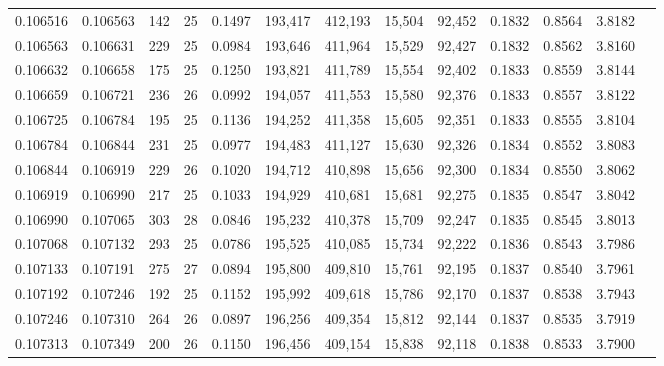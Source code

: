 \begin{tabular}{rrrrrrrrrrrrr}
0.106516 & 0.106563 & 142 &  25 &                                     0.1497 & 193,417 & 412,193 &  15,504 &  92,452 & 0.1832 & 0.8564 & 3.8182 \\
0.106563 & 0.106631 & 229 &  25 &                                     0.0984 & 193,646 & 411,964 &  15,529 &  92,427 & 0.1832 & 0.8562 & 3.8160 \\
0.106632 & 0.106658 & 175 &  25 &                                     0.1250 & 193,821 & 411,789 &  15,554 &  92,402 & 0.1833 & 0.8559 & 3.8144 \\
0.106659 & 0.106721 & 236 &  26 &                                     0.0992 & 194,057 & 411,553 &  15,580 &  92,376 & 0.1833 & 0.8557 & 3.8122 \\
0.106725 & 0.106784 & 195 &  25 &                                     0.1136 & 194,252 & 411,358 &  15,605 &  92,351 & 0.1833 & 0.8555 & 3.8104 \\
0.106784 & 0.106844 & 231 &  25 &                                     0.0977 & 194,483 & 411,127 &  15,630 &  92,326 & 0.1834 & 0.8552 & 3.8083 \\
0.106844 & 0.106919 & 229 &  26 &                                     0.1020 & 194,712 & 410,898 &  15,656 &  92,300 & 0.1834 & 0.8550 & 3.8062 \\
0.106919 & 0.106990 & 217 &  25 &                                     0.1033 & 194,929 & 410,681 &  15,681 &  92,275 & 0.1835 & 0.8547 & 3.8042 \\
0.106990 & 0.107065 & 303 &  28 &                                     0.0846 & 195,232 & 410,378 &  15,709 &  92,247 & 0.1835 & 0.8545 & 3.8013 \\
0.107068 & 0.107132 & 293 &  25 &                                     0.0786 & 195,525 & 410,085 &  15,734 &  92,222 & 0.1836 & 0.8543 & 3.7986 \\
0.107133 & 0.107191 & 275 &  27 &                                     0.0894 & 195,800 & 409,810 &  15,761 &  92,195 & 0.1837 & 0.8540 & 3.7961 \\
0.107192 & 0.107246 & 192 &  25 &                                     0.1152 & 195,992 & 409,618 &  15,786 &  92,170 & 0.1837 & 0.8538 & 3.7943 \\
0.107246 & 0.107310 & 264 &  26 &                                     0.0897 & 196,256 & 409,354 &  15,812 &  92,144 & 0.1837 & 0.8535 & 3.7919 \\
0.107313 & 0.107349 & 200 &  26 &                                     0.1150 & 196,456 & 409,154 &  15,838 &  92,118 & 0.1838 & 0.8533 & 3.7900 \\

\end{tabular}
